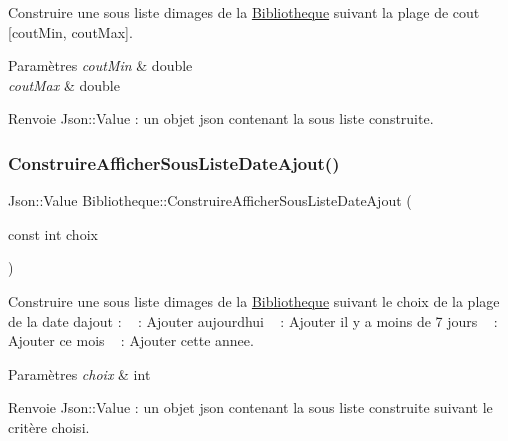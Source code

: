 Construire une sous liste d\textquotesingle{}images de la \hyperlink{classBibliotheque}{Bibliotheque} suivant la plage de cout \mbox{[}cout\+Min, cout\+Max\mbox{]}. 


\begin{DoxyParams}{Paramètres}
{\em cout\+Min} & double \\
\hline
{\em cout\+Max} & double \\
\hline
\end{DoxyParams}
\begin{DoxyReturn}{Renvoie}
Json\+::\+Value \+: un objet json contenant la sous liste construite. 
\end{DoxyReturn}
\mbox{\label{classBibliotheque_a6b50b88a3f8f402052649e1bdc495b9a}} 
\subsubsection{\texorpdfstring{Construire\+Afficher\+Sous\+Liste\+Date\+Ajout()}{ConstruireAfficherSousListeDateAjout()}}
{\footnotesize\ttfamily Json\+::\+Value Bibliotheque\+::\+Construire\+Afficher\+Sous\+Liste\+Date\+Ajout (\begin{DoxyParamCaption}\item[{const int}]{choix }\end{DoxyParamCaption})}



Construire une sous liste d\textquotesingle{}images de la \hyperlink{classBibliotheque}{Bibliotheque} suivant le choix de la plage de la date d\textquotesingle{}ajout \+: ~ \+: Ajouter aujourd\textquotesingle{}hui ~ \+: Ajouter il y a moins de 7 jours ~ \+: Ajouter ce mois ~ \+: Ajouter cette annee. 


\begin{DoxyParams}{Paramètres}
{\em choix} & int \\
\hline
\end{DoxyParams}
\begin{DoxyReturn}{Renvoie}
Json\+::\+Value \+: un objet json contenant la sous liste construite suivant le critère choisi. 
\end{DoxyReturn}
\mbox{\label{classBibliotheque_af2649bd20b0cf9cd35165abee4a45a12}} 

